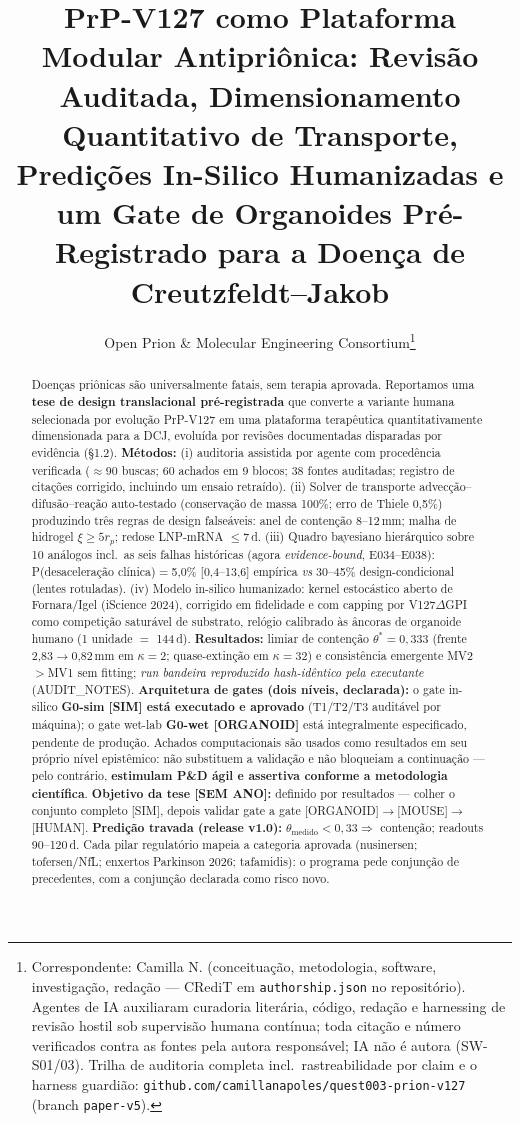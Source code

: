 \documentclass[10pt,twocolumn]{article}
\title{\bfseries PrP-V127 como Plataforma Modular Antipriônica: Revisão Auditada, Dimensionamento Quantitativo de Transporte, Predições In-Silico Humanizadas e um Gate de Organoides Pré-Registrado para a Doença de Creutzfeldt--Jakob}
\author{\normalsize Open Prion \& Molecular Engineering Consortium\thanks{Correspondente: Camilla N. (conceituação, metodologia, software, investigação, redação --- CRediT em \texttt{authorship.json} no repositório). Agentes de IA auxiliaram curadoria literária, código, redação e harnessing de revisão hostil sob supervisão humana contínua; toda citação e número verificados contra as fontes pela autora responsável; IA não é autora (SW-S01/03). Trilha de auditoria completa incl.\ rastreabilidade por claim e o harness guardião: \texttt{github.com/camillanapoles/quest003-prion-v127} (branch \texttt{paper-v5}).}}
\date{}
\begin{document}
\maketitle

\begin{abstract}\small
Doenças priônicas são universalmente fatais, sem terapia aprovada. Reportamos uma \textbf{tese de design translacional pré-registrada} que converte a variante humana selecionada por evolução PrP-V127 em uma plataforma terapêutica quantitativamente dimensionada para a DCJ, evoluída por revisões documentadas disparadas por evidência (\S1.2). \textbf{Métodos:} (i) auditoria assistida por agente com procedência verificada ($\approx$90 buscas; 60 achados em 9 blocos; 38 fontes auditadas; registro de citações corrigido, incluindo um ensaio retraído). (ii) Solver de transporte advecção--difusão--reação auto-testado (conservação de massa 100\%; erro de Thiele 0,5\%) produzindo três regras de design falseáveis: anel de contenção 8--12\,mm; malha de hidrogel $\xi\ge5r_p$; redose LNP-mRNA $\le$7\,d. (iii) Quadro bayesiano hierárquico sobre 10 análogos incl.\ as seis falhas históricas (agora \emph{evidence-bound}, E034--E038): P(desaceleração clínica)$=$5,0\% [0,4--13,6] empírica \emph{vs} 30--45\% design-condicional (lentes rotuladas). (iv) Modelo in-silico humanizado: kernel estocástico aberto de Fornara/Igel (iScience 2024), corrigido em fidelidade e com capping por V127$\Delta$GPI como competição saturável de substrato, relógio calibrado às âncoras de organoide humano (1 unidade $=$ 144\,d). \textbf{Resultados:} limiar de contenção $\theta^{*}=0,333$ (frente 2,83$\to$0,82\,mm em $\kappa{=}2$; quase-extinção em $\kappa{=}32$) e consistência emergente MV2$>$MV1 sem fitting; \emph{run bandeira reproduzido hash-idêntico pela executante} (AUDIT\_NOTES). \textbf{Arquitetura de gates (dois níveis, declarada):} o gate in-silico \textbf{G0-sim [SIM] está executado e aprovado} (T1/T2/T3 auditável por máquina); o gate wet-lab \textbf{G0-wet [ORGANOID]} está integralmente especificado, pendente de produção. Achados computacionais são usados como resultados em seu próprio nível epistêmico: não substituem a validação e não bloqueiam a continuação --- pelo contrário, \textbf{estimulam P\&D ágil e assertiva conforme a metodologia científica}. \textbf{Objetivo da tese [SEM ANO]:} definido por resultados --- colher o conjunto completo [SIM], depois validar gate a gate [ORGANOID]$\to$[MOUSE]$\to$[HUMAN]. \textbf{Predição travada (release v1.0):} $\theta_{\text{medido}}<0,33\Rightarrow$ contenção; readouts 90--120\,d. Cada pilar regulatório mapeia a categoria aprovada (nusinersen; tofersen/NfL; enxertos Parkinson 2026; tafamidis): o programa pede conjunção de precedentes, com a conjunção declarada como risco novo.
\end{abstract}
\end{document}
